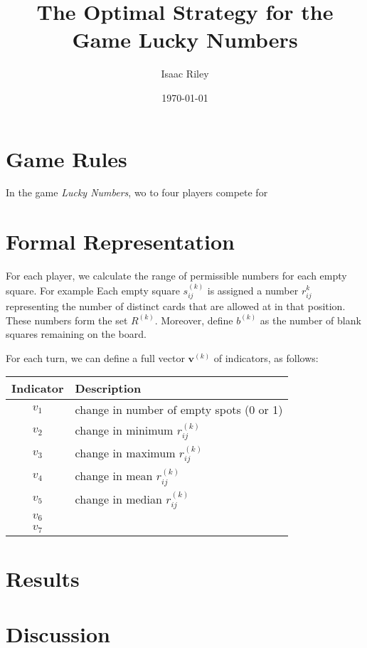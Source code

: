 \documentclass[11pt]{article}
\title{The Optimal Strategy for the Game Lucky Numbers}
\author{Isaac Riley}
\date{\today}
\begin{document}
\maketitle
\section{Game Rules}
In the game \textit{Lucky Numbers}, wo to four players compete for 
\section{Formal Representation}
For each player, we calculate the range of permissible numbers for each empty square. 
For example %
Each empty square $s^{(k)}_{ij}$ is assigned a number $r^{k}_{ij}$ representing the number of distinct cards that are allowed at in that position.
These numbers form the set $R^{(k)}$.
Moreover, define $b^{(k)}$ as the number of blank squares remaining on the board. 

For each turn, we can define a full vector $\textbf{v}^{(k)}$ of indicators, as follows:\\
\begin{tabular}{cl}
Indicator & Description \\ \hline
$v_1$ & change in number of empty spots (0 or 1) \\
$v_2$ & change in minimum $r^{(k)}_{ij}$ \\
$v_3$ & change in maximum $r^{(k)}_{ij}$ \\
$v_4$ & change in mean $r^{(k)}_{ij}$ \\
$v_5$ & change in median $r^{(k)}_{ij}$ \\
$v_6$ &  \\
$v_7$ & 
\end{tabular}
\section{Results}

\section{Discussion}
\end{document}
